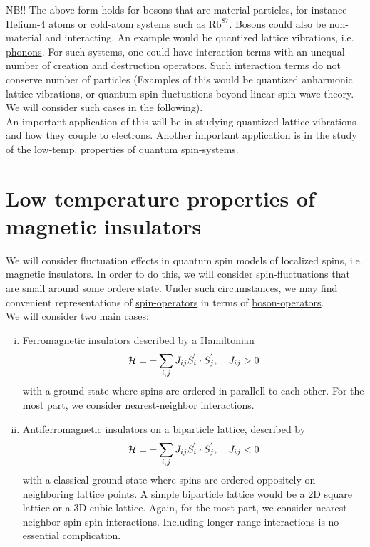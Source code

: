 NB!! The above form holds for bosons that are material particles, for instance Helium-4 atoms or cold-atom systems such as $\text{Rb}^{87}$. Bosons could also be non-material and interacting. An example would be quantized lattice vibrations, i.e. \uline{phonons}. For such systems, one could have interaction terms with an unequal number of creation and destruction operators. Such interaction terms do not conserve number of particles (Examples of this would be quantized anharmonic lattice vibrations, or quantum spin-fluctuations beyond linear spin-wave theory. We will consider such cases in the following). \\

An important application of this will be in studying quantized lattice vibrations and how they couple to electrons. Another important application is in the study of the low-temp. properties of quantum spin-systems. \\

\section{Low temperature properties of magnetic insulators}

We will consider fluctuation effects in quantum spin models of localized spins, i.e. magnetic insulators. In order to do this, we will consider spin-fluctuations that are small around some ordere state. Under such circumstances, we may find convenient representations of \uline{spin-operators} in terms of \uline{boson-operators}. \\

We will consider two main cases:
\begin{enumerate}[i)]
    \item \uline{Ferromagnetic insulators} described by a Hamiltonian
    \begin{equation}
        \mathcal{H} = -\sum_{i, j} J_{ij} \Vec{S_i}\cdot\Vec{S_j}, \quad J_{ij} > 0
    \end{equation}
    with a ground state where spins are ordered in parallell to each other. For the most part, we consider nearest-neighbor interactions.
    \item \uline{Antiferromagnetic insulators on a biparticle lattice}, described by
    \begin{equation}
        \mathcal{H} = -\sum_{i, j} J_{ij} \Vec{S_i}\cdot\Vec{S_j}, \quad J_{ij} < 0
    \end{equation}
    with a classical ground state where spins are ordered oppositely on neighboring lattice points. A simple biparticle lattice would be a 2D square lattice or a 3D cubic lattice. Again, for the most part, we consider nearest-neighbor spin-spin interactions. Including longer range interactions is no essential complication.
\end{enumerate}


